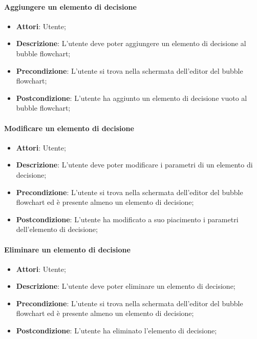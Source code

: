 \paragraph{Aggiungere un elemento di decisione}
\begin{itemize}
	\item \textbf{Attori}: Utente;
	\item \textbf{Descrizione}: L'utente deve poter aggiungere un elemento di decisione al bubble flowchart;
	\item \textbf{Precondizione}: L'utente si trova nella schermata dell'editor del bubble flowchart;
	\item \textbf{Postcondizione}: L'utente ha aggiunto un elemento di decisione vuoto al bubble flowchart;
\end{itemize}

\paragraph{Modificare un elemento di decisione}
\begin{itemize}
	\item \textbf{Attori}: Utente;
	\item \textbf{Descrizione}: L'utente deve poter modificare i parametri di un elemento di decisione;
	\item \textbf{Precondizione}: L'utente si trova nella schermata dell'editor del bubble flowchart ed è presente almeno un elemento di decisione;
	\item \textbf{Postcondizione}: L'utente ha modificato a suo piacimento i parametri dell'elemento di decisione;
\end{itemize}

\paragraph{Eliminare un elemento di decisione}
\begin{itemize}
	\item \textbf{Attori}: Utente;
	\item \textbf{Descrizione}: L'utente deve poter eliminare un elemento di decisione;
	\item \textbf{Precondizione}: L'utente si trova nella schermata dell'editor del bubble flowchart ed è presente almeno un elemento di decisione;
	\item \textbf{Postcondizione}: L'utente ha eliminato l'elemento di decisione;
\end{itemize}


